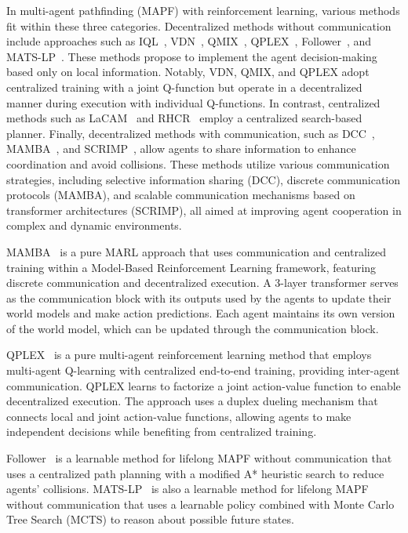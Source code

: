 \documentclass{article} %
\begin{document}
In multi-agent pathfinding (MAPF) with reinforcement learning, various methods fit within these three categories. Decentralized methods without communication include approaches such as IQL~\citep{tan1993iql}, VDN~\citep{sunehag2018vdn}, QMIX~\citep{rashid2020qmix}, QPLEX~\citep{wang2021qplex}, Follower~\citep{skrynnik2024learn}, and MATS-LP~\citep{skrynnik2024mats-lp}. These methods propose to implement the agent decision-making based only on local information. Notably, VDN, QMIX, and QPLEX adopt centralized training with a joint Q-function but operate in a decentralized manner during execution with individual Q-functions. In contrast, centralized methods such as LaCAM~\citep{okumura2023lacam} and RHCR~\citep{li2021rhcr} employ a centralized search-based planner. Finally, decentralized methods with communication, such as DCC~\citep{ma2021dcc}, MAMBA~\citep{egorov2022mamba}, and SCRIMP~\citep{wang2023scrimp}, allow agents to share information to enhance coordination and avoid collisions. These methods utilize various communication strategies, including selective information sharing (DCC), discrete communication protocols (MAMBA), and scalable communication mechanisms based on transformer architectures (SCRIMP), all aimed at improving agent cooperation in complex and dynamic environments. 

MAMBA~\citep{egorov2022mamba} is a pure MARL approach that uses communication and centralized training within a Model-Based Reinforcement Learning framework, featuring discrete communication and decentralized execution. A 3-layer transformer serves as the communication block with its outputs used by the agents to update their world models and make action predictions. Each agent maintains its own version of the world model, which can be updated through the communication block.

QPLEX~\citep{wang2021qplex} is a pure multi-agent reinforcement learning method that employs multi-agent Q-learning with centralized end-to-end training, providing inter-agent communication. QPLEX learns to factorize a joint action-value function to enable decentralized execution. The approach uses a duplex dueling mechanism that connects local and joint action-value functions, allowing agents to make independent decisions while benefiting from centralized training.

Follower~\citep{skrynnik2024learn} is a learnable method for lifelong MAPF without communication that uses a centralized path planning with a modified A* heuristic search to reduce agents' collisions. MATS-LP~\citep{skrynnik2024mats-lp} is also a learnable method for lifelong MAPF without communication that uses a learnable policy combined with Monte Carlo Tree Search (MCTS) to reason about possible future states. 
\end{document}
